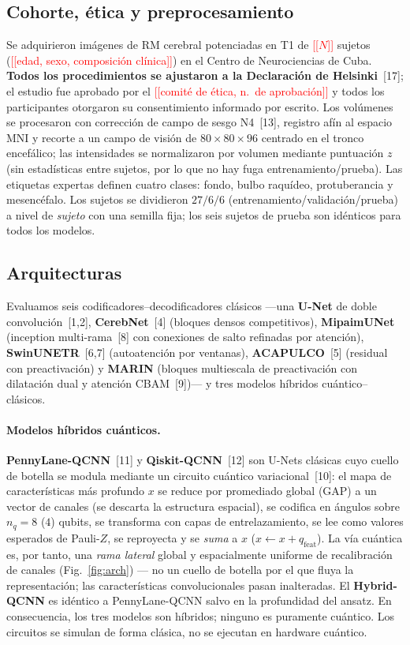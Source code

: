 \documentclass[runningheads]{llncs}
\newcommand{\todo}[1]{\textcolor{red}{[[#1]]}}
\begin{document}
\subsection{Cohorte, ética y preprocesamiento}
Se adquirieron imágenes de RM cerebral potenciadas en T1 de \todo{$N$} sujetos
(\todo{edad, sexo, composición clínica}) en el Centro de Neurociencias de Cuba.
\textbf{Todos los procedimientos se ajustaron a la Declaración de
Helsinki}~[17]; el estudio fue aprobado por el
\todo{comité de ética, n.\ de aprobación} y todos los participantes otorgaron
su consentimiento informado por escrito. Los volúmenes se procesaron con
corrección de campo de sesgo N4~[13], registro afín al espacio MNI y
recorte a un campo de visión de $80\times80\times96$ centrado en el tronco
encefálico; las intensidades se normalizaron por volumen mediante puntuación
$z$ (sin estadísticas entre sujetos, por lo que no hay fuga
entrenamiento/prueba). Las etiquetas expertas definen cuatro clases: fondo,
bulbo raquídeo, protuberancia y mesencéfalo. Los sujetos se dividieron $27/6/6$
(entrenamiento/validación/prueba) a nivel de \emph{sujeto} con una semilla fija;
los seis sujetos de prueba son idénticos para todos los modelos.

\subsection{Arquitecturas}
Evaluamos seis codificadores--decodificadores clásicos ---una \textbf{U-Net} de
doble convolución~[1,2], \textbf{CerebNet}~[4] (bloques
densos competitivos), \textbf{MipaimUNet} (inception multi-rama~[8]
con conexiones de salto refinadas por atención),
\textbf{SwinUNETR}~[6,7] (autoatención por ventanas),
\textbf{ACAPULCO}~[5] (residual con preactivación) y \textbf{MARIN}
(bloques multiescala de preactivación con dilatación dual y atención
CBAM~[9])--- y tres modelos híbridos cuántico--clásicos.

\paragraph{Modelos híbridos cuánticos.} \textbf{PennyLane-QCNN}~[11]
y \textbf{Qiskit-QCNN}~[12] son U-Nets clásicas cuyo cuello de botella
se modula mediante un circuito cuántico variacional~[10]: el mapa de
características más profundo $x$ se reduce por promediado global (GAP) a un vector
de canales (se descarta la estructura espacial), se codifica en ángulos sobre
$n_q{=}8$ ($4$) qubits, se transforma con capas de entrelazamiento, se lee como
valores esperados de Pauli-$Z$, se reproyecta y se \emph{suma} a $x$
($x \leftarrow x + q_{\text{feat}}$). La vía cuántica es, por tanto, una
\emph{rama lateral} global y espacialmente uniforme de recalibración de canales
(Fig.~\ref{fig:arch}) --- no un cuello de botella por el que fluya la
representación; las características convolucionales pasan inalteradas. El
\textbf{Hybrid-QCNN} es idéntico a PennyLane-QCNN salvo en la profundidad del
ansatz. En consecuencia, los tres modelos son híbridos; ninguno es puramente
cuántico. Los circuitos se simulan de forma clásica, no se ejecutan en hardware
cuántico.
\end{document}
